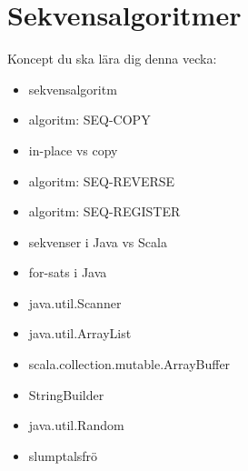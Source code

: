 \chapter{Sekvensalgoritmer}\label{chapter:W05}
Koncept du ska lära dig denna vecka:
\begin{multicols}{2}\begin{itemize}[nosep,label={$\square$},leftmargin=*]
\item sekvensalgoritm
\item algoritm: SEQ-COPY
\item in-place vs copy
\item algoritm: SEQ-REVERSE
\item algoritm: SEQ-REGISTER
\item sekvenser i Java vs Scala
\item for-sats i Java
\item java.util.Scanner
\item java.util.ArrayList
\item scala.collection.mutable.ArrayBuffer
\item StringBuilder
\item java.util.Random
\item slumptalsfrö\end{itemize}\end{multicols}
